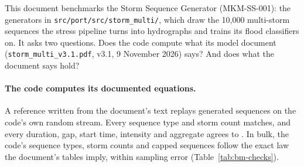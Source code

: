 \documentclass[11pt,a4paper]{article}
\begin{document}
\sloppy

\mkmtitlepage
\mkmlegalpage

\tableofcontents
\clearpage

\mkmexecsummary

This document benchmarks the Storm Sequence Generator (MKM-SS-001): the generators in
\texttt{src/port/src/storm\_multi/}, which draw the 10{,}000 multi-storm sequences the
stress pipeline turns into hydrographs and trains its flood classifiers on. It asks two
questions. Does the code compute what its model document (\texttt{storm\_multi\_v3.1.pdf},
v3.1, 9 November 2026) says? And does what the document says hold?

\paragraph{The code computes its documented equations.} A reference written from the
document's text replays \bmReplayN{} generated sequences on the code's own random stream.
Every sequence type and storm count matches, and every duration, gap, start time,
intensity and aggregate agrees to \bmCodeErr. In bulk, the code's sequence types, storm
counts and capped sequences follow the exact law the document's tables imply, within
sampling error (Table~\ref{tab:bm-checks}). \bmWolframConfirms{}
\end{document}
